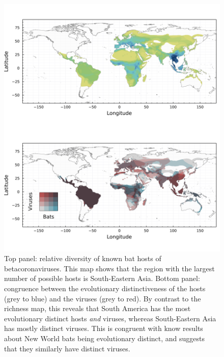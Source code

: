 \documentclass[11pt]{article}
\makeatletter
\def\maxwidth{\ifdim\Gin@nat@width>\linewidth\linewidth
\else\Gin@nat@width\fi}
\let\Oldincludegraphics\includegraphics
\renewcommand{\includegraphics}[1]{\Oldincludegraphics[width=\maxwidth]{#1}}
\makeatother
\begin{document}
\begin{figure}
\hypertarget{fig:richness}{%
\centering
\includegraphics{figures/combined_richness.png}
\caption{Top panel: relative diversity of known bat hosts of
betacoronaviruses. This map shows that the region with the largest
number of possible hosts is South-Eastern Asia. Bottom panel: congruence
between the evolutionary distinctiveness of the hosts (grey to blue) and
the viruses (grey to red). By contrast to the richness map, this reveals
that South America has the most evolutionary distinct hosts \emph{and}
viruses, whereas South-Eastern Asia has mostly distinct viruses. This is
congruent with know results about New World bats being evolutionary
distinct, and suggests that they similarly have distinct
viruses.}\label{fig:richness}
}
\end{figure}
\end{document}
